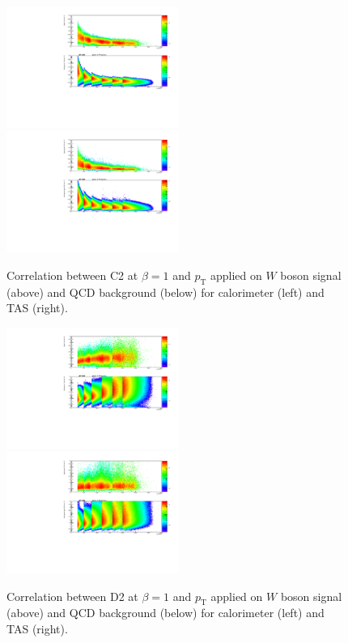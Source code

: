\begin{figure}[htp]
\includegraphics[width=0.5\textwidth]{sascha_input/plots/W/beta1/scatter_plots/scatter_h_scatter_reco_C2.pdf}
\bigskip
\includegraphics[width=0.5\textwidth]{sascha_input/plots/W/beta1/scatter_plots/scatter_h_scatter_assisted_tj_C2.pdf} 
\caption{\footnotesize{Correlation between C2 at $\beta=1$ and $p_{\mathrm{T}}$ applied on $W$ boson signal (above) and QCD background (below) for calorimeter (left) and TAS (right).}}\label{fig:correlation_C2}
\end{figure}

\begin{figure}[htp]
\includegraphics[width=0.5\textwidth]{sascha_input/plots/W/beta1/scatter_plots/scatter_h_scatter_reco_D2.pdf}
\bigskip
\includegraphics[width=0.5\textwidth]{sascha_input/plots/W/beta1/scatter_plots/scatter_h_scatter_assisted_tj_D2.pdf} 
\caption{\footnotesize{Correlation between D2 at $\beta=1$ and $p_{\mathrm{T}}$ applied on $W$ boson signal (above) and QCD background (below) for calorimeter (left) and TAS (right).}}\label{fig:correlation_D2}
\end{figure}

